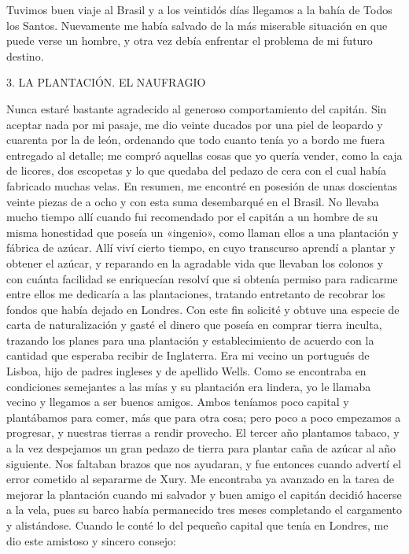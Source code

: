 \documentclass{novela}
\begin{document}
    Tuvimos buen viaje al Brasil y a los veintidós días llegamos a la bahía de Todos los Santos. Nuevamente me había salvado de la más miserable situación en que puede verse un hombre, y otra vez debía enfrentar el problema de mi futuro destino.





    3. LA PLANTACIÓN. EL NAUFRAGIO




    Nunca estaré bastante agradecido al generoso comportamiento del capitán. Sin aceptar nada por mi pasaje, me dio veinte ducados por una piel de leopardo y cuarenta por la de león, ordenando que todo cuanto tenía yo a bordo me fuera entregado al detalle; me compró aquellas cosas que yo quería vender, como la caja de licores, dos escopetas y lo que quedaba del pedazo de cera con el cual había fabricado muchas velas. En resumen, me encontré en posesión de unas doscientas veinte piezas de a ocho y con esta suma desembarqué en el Brasil.
    No llevaba mucho tiempo allí cuando fui recomendado por el capitán a un hombre de su misma honestidad que poseía un «ingenio», como llaman ellos a una plantación y fábrica de azúcar. Allí viví cierto tiempo, en cuyo transcurso aprendí a plantar y obtener el azúcar, y reparando en la agradable vida que llevaban los colonos y con cuánta facilidad se enriquecían resolví que si obtenía permiso para radicarme entre ellos me dedicaría a las plantaciones, tratando entretanto de recobrar los fondos que había dejado en Londres. Con este fin solicité y obtuve una especie de carta de naturalización y gasté el dinero que poseía en comprar tierra inculta, trazando los planes para una plantación y establecimiento de acuerdo con la cantidad que esperaba recibir de Inglaterra.
    Era mi vecino un portugués de Lisboa, hijo de padres ingleses y de apellido Wells. Como se encontraba en condiciones semejantes a las mías y su plantación era lindera, yo le llamaba vecino y llegamos a ser buenos amigos. Ambos teníamos poco capital y plantábamos para comer, más que para otra cosa; pero poco a poco empezamos a progresar, y nuestras tierras a rendir provecho. El tercer año plantamos tabaco, y a la vez despejamos un gran pedazo de tierra para plantar caña de azúcar al año siguiente. Nos faltaban brazos que nos ayudaran, y fue entonces cuando advertí el error cometido al separarme de Xury.
    Me encontraba ya avanzado en la tarea de mejorar la plantación cuando mi salvador y buen amigo el capitán decidió hacerse a la vela, pues su barco había permanecido tres meses completando el cargamento y alistándose. Cuando le conté lo del pequeño capital que tenía en Londres, me dio este amistoso y sincero consejo:
\end{document}
